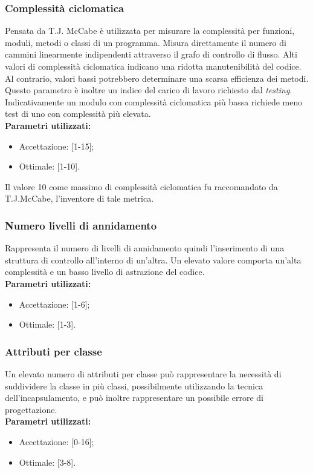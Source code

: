 \subsubsection{Complessità ciclomatica}
Pensata da T.J. McCabe è utilizzata per misurare la complessità per funzioni, moduli, metodi o classi di un programma. Misura direttamente il numero di cammini linearmente indipendenti attraverso il grafo di controllo di flusso.
Alti valori di complessità ciclomatica indicano una ridotta manutenibilità del codice. Al contrario, valori bassi potrebbero determinare una scarsa efficienza dei metodi. Questo parametro è inoltre un indice del carico di lavoro richiesto dal \textit{testing}. Indicativamente un modulo con complessità ciclomatica più bassa richiede meno test di uno con complessità più elevata.\\
\textbf{Parametri utilizzati:}
\begin{itemize}
\item Accettazione: [1-15];
\item Ottimale: [1-10].
\end{itemize}
Il valore 10 come massimo di complessità ciclomatica fu raccomandato da T.J.McCabe, l'inventore di tale metrica.
\subsubsection{Numero livelli di annidamento}
Rappresenta il numero di livelli di annidamento quindi l'inserimento di una struttura di controllo all'interno di un'altra. Un elevato valore comporta un'alta complessità e un basso livello di astrazione del codice.\\
\textbf{Parametri utilizzati:}
\begin{itemize}
\item Accettazione: [1-6];
\item Ottimale: [1-3].
\end{itemize}
\subsubsection{Attributi per classe}
Un elevato numero di attributi per classe può rappresentare la necessità di suddividere la classe in più classi, possibilmente utilizzando la tecnica dell'incapsulamento, e può inoltre rappresentare un possibile errore di progettazione.\\
\textbf{Parametri utilizzati:}
\begin{itemize}
\item Accettazione: [0-16];
\item Ottimale: [3-8].
\end{itemize}
